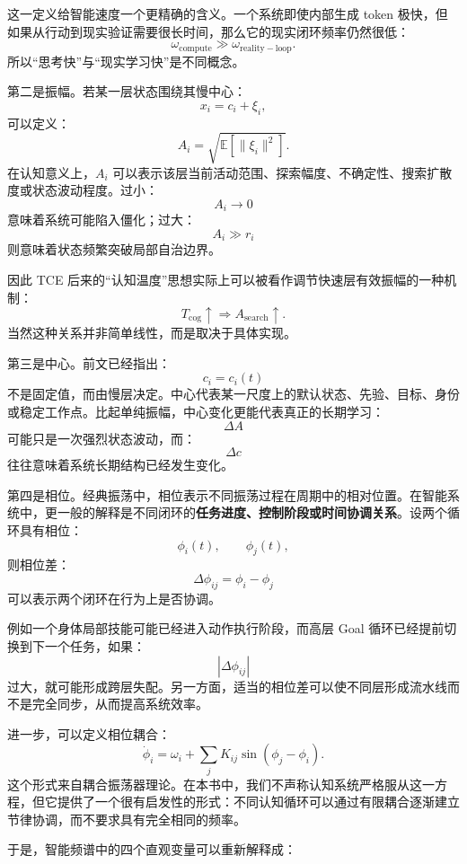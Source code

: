 这一定义给智能速度一个更精确的含义。一个系统即使内部生成 token 极快，但如果从行动到现实验证需要很长时间，那么它的现实闭环频率仍然很低：
\[
\omega_{\mathrm{compute}}
\gg
\omega_{\mathrm{reality-loop}}.
\]
所以“思考快”与“现实学习快”是不同概念。

第二是振幅。若某一层状态围绕其慢中心：
\[
x_i
=
c_i+\xi_i,
\]
可以定义：
\[
A_i
=
\sqrt{
\mathbb{E}
[
\|\xi_i\|^2
]
}.
\]
在认知意义上，$A_i$ 可以表示该层当前活动范围、探索幅度、不确定性、搜索扩散度或状态波动程度。过小：
\[
A_i\rightarrow0
\]
意味着系统可能陷入僵化；过大：
\[
A_i\gg r_i
\]
则意味着状态频繁突破局部自治边界。

因此 TCE 后来的“认知温度”思想实际上可以被看作调节快速层有效振幅的一种机制：
\[
T_{\mathrm{cog}}\uparrow
\Rightarrow
A_{\mathrm{search}}\uparrow.
\]
当然这种关系并非简单线性，而是取决于具体实现。

第三是中心。前文已经指出：
\[
c_i=c_i(t)
\]
不是固定值，而由慢层决定。中心代表某一尺度上的默认状态、先验、目标、身份或稳定工作点。比起单纯振幅，中心变化更能代表真正的长期学习：
\[
\Delta A
\]
可能只是一次强烈状态波动，而：
\[
\Delta c
\]
往往意味着系统长期结构已经发生变化。

第四是相位。经典振荡中，相位表示不同振荡过程在周期中的相对位置。在智能系统中，更一般的解释是不同闭环的\textbf{任务进度、控制阶段或时间协调关系}。设两个循环具有相位：
\[
\phi_i(t),\qquad
\phi_j(t),
\]
则相位差：
\[
\Delta\phi_{ij}
=
\phi_i-\phi_j
\]
可以表示两个闭环在行为上是否协调。

例如一个身体局部技能可能已经进入动作执行阶段，而高层 Goal 循环已经提前切换到下一个任务，如果：
\[
|\Delta\phi_{ij}|
\]
过大，就可能形成跨层失配。另一方面，适当的相位差可以使不同层形成流水线而不是完全同步，从而提高系统效率。

进一步，可以定义相位耦合：
\[
\dot{\phi}_i
=
\omega_i
+
\sum_j
K_{ij}
\sin
(\phi_j-\phi_i).
\]
这个形式来自耦合振荡器理论。在本书中，我们不声称认知系统严格服从这一方程，但它提供了一个很有启发性的形式：不同认知循环可以通过有限耦合逐渐建立节律协调，而不要求具有完全相同的频率。

于是，智能频谱中的四个直观变量可以重新解释成：

\begin{statementbox}
\centering
{}
\end{statementbox}

\begin{statementbox}
\centering
{}
\end{statementbox}


